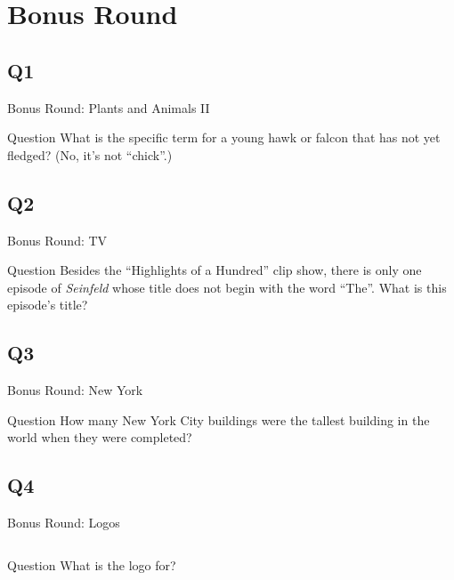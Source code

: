 \documentclass[11pt]{beamer}
\begin{document}
\section{Bonus Round}
\subsection*{Q1}
\begin{frame}[t]{Bonus Round: Plants and Animals II}
\begin{block}{Question}
What is the specific term for a young hawk or falcon that has not yet fledged? (No, it's not ``chick''.)
\end{block}
\end{frame}
\subsection*{Q2}
\begin{frame}[t]{Bonus Round: TV}
\begin{block}{Question}
Besides the ``Highlights of a Hundred'' clip show, there is only one episode of \emph{Seinfeld} whose title does not begin with the word ``The''. What is this episode's title?
\end{block}
\end{frame}
\subsection*{Q3}
\begin{frame}[t]{Bonus Round: New York}
\begin{block}{Question}
How many New York City  buildings were the tallest building in the world when they were completed?
\end{block}
\end{frame}
\subsection*{Q4}
\begin{frame}[t]{Bonus Round: Logos}
\begin{columns}[T,totalwidth=\linewidth]
\begin{column}{0.32\linewidth}
\begin{block}{Question}
What is the logo for?
\end{block}
\end{column}
\begin{column}{0.65\linewidth}
\begin{center}
\texttt{[image: \{Images/paris2024bid]}.png}
\end{center}
\end{column}
\end{columns}
\end{frame}
\end{document}
